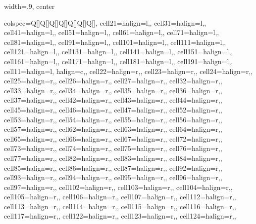 \documentclass[12pt]{article}
\begin{document}
\begin{table}
  \caption{\label{tbl:mlp_sumstats}Summary statistics for Chinese and Japanese linked in MLP}
  \begin{adjustbox}{width=.9\textwidth, center}
\begin{tblr}[         %
]                     %
{                     %
colspec={Q[]Q[]Q[]Q[]Q[]Q[]Q[]},
cell{2}{1}={}{halign=l,},
cell{3}{1}={}{halign=l,},
cell{4}{1}={}{halign=l,},
cell{5}{1}={}{halign=l,},
cell{6}{1}={}{halign=l,},
cell{7}{1}={}{halign=l,},
cell{8}{1}={}{halign=l,},
cell{9}{1}={}{halign=l,},
cell{10}{1}={}{halign=l,},
cell{11}{1}={}{halign=l,},
cell{12}{1}={}{halign=l,},
cell{13}{1}={}{halign=l,},
cell{14}{1}={}{halign=l,},
cell{15}{1}={}{halign=l,},
cell{16}{1}={}{halign=l,},
cell{17}{1}={}{halign=l,},
cell{18}{1}={}{halign=l,},
cell{19}{1}={}{halign=l,},
cell{1}{1}={}{halign=l, halign=c,},
cell{2}{2}={}{halign=r,},
cell{2}{3}={}{halign=r,},
cell{2}{4}={}{halign=r,},
cell{2}{5}={}{halign=r,},
cell{2}{6}={}{halign=r,},
cell{2}{7}={}{halign=r,},
cell{3}{2}={}{halign=r,},
cell{3}{3}={}{halign=r,},
cell{3}{4}={}{halign=r,},
cell{3}{5}={}{halign=r,},
cell{3}{6}={}{halign=r,},
cell{3}{7}={}{halign=r,},
cell{4}{2}={}{halign=r,},
cell{4}{3}={}{halign=r,},
cell{4}{4}={}{halign=r,},
cell{4}{5}={}{halign=r,},
cell{4}{6}={}{halign=r,},
cell{4}{7}={}{halign=r,},
cell{5}{2}={}{halign=r,},
cell{5}{3}={}{halign=r,},
cell{5}{4}={}{halign=r,},
cell{5}{5}={}{halign=r,},
cell{5}{6}={}{halign=r,},
cell{5}{7}={}{halign=r,},
cell{6}{2}={}{halign=r,},
cell{6}{3}={}{halign=r,},
cell{6}{4}={}{halign=r,},
cell{6}{5}={}{halign=r,},
cell{6}{6}={}{halign=r,},
cell{6}{7}={}{halign=r,},
cell{7}{2}={}{halign=r,},
cell{7}{3}={}{halign=r,},
cell{7}{4}={}{halign=r,},
cell{7}{5}={}{halign=r,},
cell{7}{6}={}{halign=r,},
cell{7}{7}={}{halign=r,},
cell{8}{2}={}{halign=r,},
cell{8}{3}={}{halign=r,},
cell{8}{4}={}{halign=r,},
cell{8}{5}={}{halign=r,},
cell{8}{6}={}{halign=r,},
cell{8}{7}={}{halign=r,},
cell{9}{2}={}{halign=r,},
cell{9}{3}={}{halign=r,},
cell{9}{4}={}{halign=r,},
cell{9}{5}={}{halign=r,},
cell{9}{6}={}{halign=r,},
cell{9}{7}={}{halign=r,},
cell{10}{2}={}{halign=r,},
cell{10}{3}={}{halign=r,},
cell{10}{4}={}{halign=r,},
cell{10}{5}={}{halign=r,},
cell{10}{6}={}{halign=r,},
cell{10}{7}={}{halign=r,},
cell{11}{2}={}{halign=r,},
cell{11}{3}={}{halign=r,},
cell{11}{4}={}{halign=r,},
cell{11}{5}={}{halign=r,},
cell{11}{6}={}{halign=r,},
cell{11}{7}={}{halign=r,},
cell{12}{2}={}{halign=r,},
cell{12}{3}={}{halign=r,},
cell{12}{4}={}{halign=r,},
}
\end{tblr}
\end{adjustbox}
\end{table}
\end{document}
